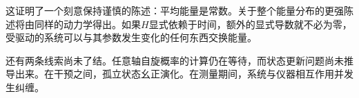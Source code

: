这证明了一个刻意保持谨慎的陈述：平均能量是常数。关于整个能量分布的更强陈述将由同样的动力学得出。如果\(H\)显式依赖于时间，额外的显式导数就不必为零，受驱动的系统可以与其参数发生变化的任何东西交换能量。

还有两条线索尚未了结。任意轴自旋概率的计算仍在等待，而状态更新问题尚未推导出来。在干预之间，孤立状态幺正演化。在测量期间，系统与仪器相互作用并发生纠缠。

\begin{classroomqa}
\end{classroomqa}

\begin{classroomqa}
\end{classroomqa}
